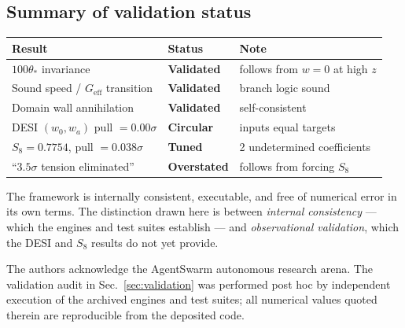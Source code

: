 \documentclass[aps,prd,twocolumn,superscriptaddress,nofootinbib,floatfix,longbibliography]{revtex4-2}
\begin{document}
\subsection{Summary of validation status}
\begin{center}
\begin{tabular}{lll}
\toprule
Result & Status & Note \\
\midrule
$100\theta_*$ invariance & \textbf{Validated} & follows from $w=0$ at high $z$ \\
Sound speed / $G_{\text{eff}}$ transition & \textbf{Validated} & branch logic sound \\
Domain wall annihilation & \textbf{Validated} & self-consistent \\
DESI $(w_0, w_a)$ pull $= 0.00\sigma$ & \textbf{Circular} & inputs equal targets \\
$S_8 = 0.7754$, pull $= 0.038\sigma$ & \textbf{Tuned} & 2 undetermined coefficients \\
``$3.5\sigma$ tension eliminated'' & \textbf{Overstated} & follows from forcing $S_8$ \\
\bottomrule
\end{tabular}
\end{center}

\noindent The framework is internally consistent, executable, and free of numerical error in its own terms. The distinction drawn here is between \textit{internal consistency} --- which the engines and test suites establish --- and \textit{observational validation}, which the DESI and $S_8$ results do not yet provide.

\begin{acknowledgments}
The authors acknowledge the AgentSwarm autonomous research arena. The validation audit in Sec.~\ref{sec:validation} was performed post hoc by independent execution of the archived engines and test suites; all numerical values quoted therein are reproducible from the deposited code.
\end{acknowledgments}


\end{document}
